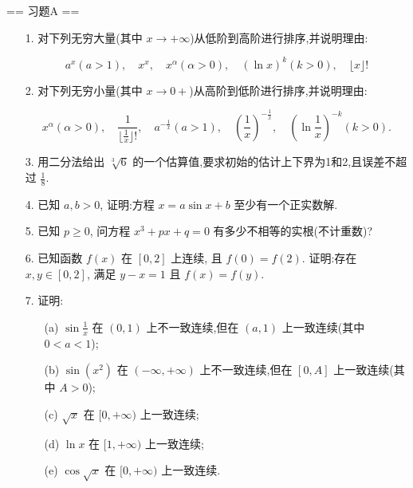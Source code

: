 \newenvironment{solution}{\begin{proofc}[解答]}{\end{proofc}}

== 习题A ==

\begin{enumerate}
    \item[1.]对下列无穷大量(其中 $\displaystyle x\rightarrow +\infty$)从低阶到高阶进行排序,并说明理由:

    \[\displaystyle a^{x}(a > 1), \quad x^{x}, \quad x^{\alpha}(\alpha >0), \quad (\ln x)^{k}(k > 0), \quad \lfloor x\rfloor !\]

    \item[2.]对下列无穷小量(其中 $\displaystyle x\rightarrow 0+$)从高阶到低阶进行排序,并说明理由:

    \[\displaystyle x^{\alpha}(\alpha >0),\quad \frac{1}{\lfloor \frac{1}{x}\rfloor !},\quad a^{-\frac{1}{x}}(a > 1),\quad \left(\frac{1}{x}\right)^{-\frac{1}{x}},\quad \left(\ln \frac{1}{x}\right)^{-k}(k > 0).\]

    \item[3.]用二分法给出 $\sqrt[3]{6}$ 的一个估算值,要求初始的估计上下界为1和2,且误差不超过 $\displaystyle\frac{1}{8}$.

    \item[4.]已知 $a,b > 0$, 证明:方程 $\displaystyle x = a\sin x + b$ 至少有一个正实数解.

    \item[5.]已知 $p\geq 0$, 问方程 $\displaystyle x^{3} + px + q = 0$ 有多少不相等的实根(不计重数)?

    \item[6.]已知函数 $f(x)$ 在 $[0,2]$ 上连续, 且 $f(0)=f(2)$. 证明:存在 $x,y\in [0,2]$, 满足 $y - x = 1$ 且 $f(x) = f(y)$.

    \item[7.]证明:
    \begin{enumerate}
        \item[(a)]$\displaystyle \sin \frac{1}{x}$ 在 $(0,1)$ 上不一致连续,但在 $(a,1)$ 上一致连续(其中 $0< a< 1$);
        \item[(b)]$\displaystyle \sin (x^{2})$ 在 $(- \infty ,+ \infty)$ 上不一致连续,但在 $[0,A]$ 上一致连续(其中 $A > 0$);
        \item[(c)]$\displaystyle \sqrt{x}$ 在 $[0,+ \infty)$ 上一致连续;
        \item[(d)]$\ln x$ 在 $[1,+ \infty)$ 上一致连续;
        \item[(e)]$\displaystyle \cos \sqrt{x}$ 在 $[0,+ \infty)$ 上一致连续.
    \end{enumerate}
\end{enumerate}


